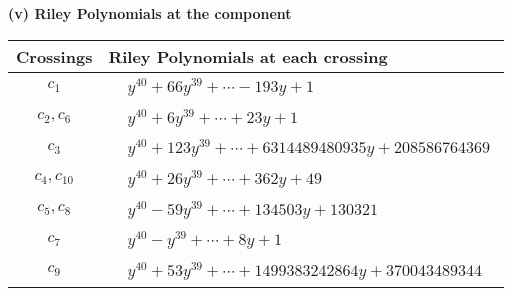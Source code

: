 \documentclass[1p]{elsarticle_modified}
\theoremstyle{definition}
\begin{document}
\newpage\renewcommand{\arraystretch}{1}
\flushleft \textbf{(v) Riley Polynomials at the component}\newline \\
\begin{tabular}{m{50pt}|m{274pt}}
Crossings & \hspace{64pt}Riley Polynomials at each crossing \\
\hline $$\begin{aligned}c_{1}\end{aligned}$$&$\begin{aligned}
&y^{40}+66 y^{39}+\cdots-193 y+1
\end{aligned}$\\
\hline $$\begin{aligned}c_{2},c_{6}\end{aligned}$$&$\begin{aligned}
&y^{40}+6 y^{39}+\cdots+23 y+1
\end{aligned}$\\
\hline $$\begin{aligned}c_{3}\end{aligned}$$&$\begin{aligned}
&y^{40}+123 y^{39}+\cdots+6314489480935 y+208586764369
\end{aligned}$\\
\hline $$\begin{aligned}c_{4},c_{10}\end{aligned}$$&$\begin{aligned}
&y^{40}+26 y^{39}+\cdots+362 y+49
\end{aligned}$\\
\hline $$\begin{aligned}c_{5},c_{8}\end{aligned}$$&$\begin{aligned}
&y^{40}-59 y^{39}+\cdots+134503 y+130321
\end{aligned}$\\
\hline $$\begin{aligned}c_{7}\end{aligned}$$&$\begin{aligned}
&y^{40}- y^{39}+\cdots+8 y+1
\end{aligned}$\\
\hline $$\begin{aligned}c_{9}\end{aligned}$$&$\begin{aligned}
&y^{40}+53 y^{39}+\cdots+1499383242864 y+370043489344
\end{aligned}$\\

\end{tabular}
\end{document}
